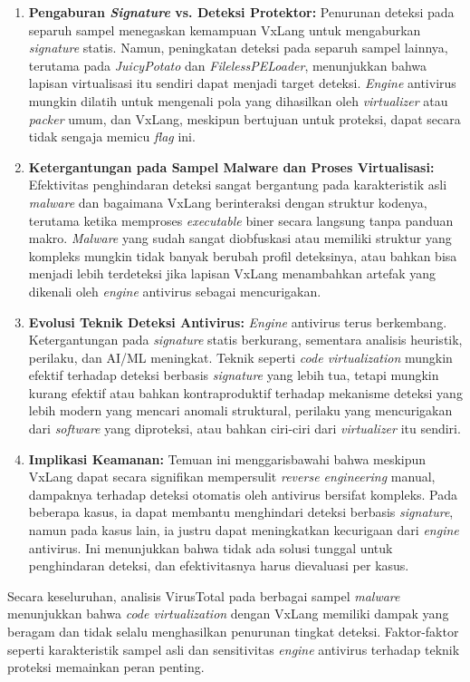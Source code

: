 \begin{enumerate}
    \item \textbf{Pengaburan \textit{Signature} vs. Deteksi Protektor:} Penurunan deteksi pada separuh sampel menegaskan kemampuan VxLang untuk mengaburkan \textit{signature} statis. Namun, peningkatan deteksi pada separuh sampel lainnya, terutama pada \textit{JuicyPotato} dan \textit{FilelessPELoader}, menunjukkan bahwa lapisan virtualisasi itu sendiri dapat menjadi target deteksi. \textit{Engine} antivirus mungkin dilatih untuk mengenali pola yang dihasilkan oleh \textit{virtualizer} atau \textit{packer} umum, dan VxLang, meskipun bertujuan untuk proteksi, dapat secara tidak sengaja memicu \textit{flag} ini.
    \item \textbf{Ketergantungan pada Sampel Malware dan Proses Virtualisasi:} Efektivitas penghindaran deteksi sangat bergantung pada karakteristik asli \textit{malware} dan bagaimana VxLang berinteraksi dengan struktur kodenya, terutama ketika memproses \textit{executable} biner secara langsung tanpa panduan makro. \textit{Malware} yang sudah sangat diobfuskasi atau memiliki struktur yang kompleks mungkin tidak banyak berubah profil deteksinya, atau bahkan bisa menjadi lebih terdeteksi jika lapisan VxLang menambahkan artefak yang dikenali oleh \textit{engine} antivirus sebagai mencurigakan.
    \item \textbf{Evolusi Teknik Deteksi Antivirus:} \textit{Engine} antivirus terus berkembang. Ketergantungan pada \textit{signature} statis berkurang, sementara analisis heuristik, perilaku, dan AI/ML meningkat. Teknik seperti \textit{code virtualization} mungkin efektif terhadap deteksi berbasis \textit{signature} yang lebih tua, tetapi mungkin kurang efektif atau bahkan kontraproduktif terhadap mekanisme deteksi yang lebih modern yang mencari anomali struktural, perilaku yang mencurigakan dari \textit{software} yang diproteksi, atau bahkan ciri-ciri dari \textit{virtualizer} itu sendiri.
    \item \textbf{Implikasi Keamanan:} Temuan ini menggarisbawahi bahwa meskipun VxLang dapat secara signifikan mempersulit \textit{reverse engineering} manual, dampaknya terhadap deteksi otomatis oleh antivirus bersifat kompleks. Pada beberapa kasus, ia dapat membantu menghindari deteksi berbasis \textit{signature}, namun pada kasus lain, ia justru dapat meningkatkan kecurigaan dari \textit{engine} antivirus. Ini menunjukkan bahwa tidak ada solusi tunggal untuk penghindaran deteksi, dan efektivitasnya harus dievaluasi per kasus.
\end{enumerate}
Secara keseluruhan, analisis VirusTotal pada berbagai sampel \textit{malware} menunjukkan bahwa \textit{code virtualization} dengan VxLang memiliki dampak yang beragam dan tidak selalu menghasilkan penurunan tingkat deteksi. Faktor-faktor seperti karakteristik sampel asli dan sensitivitas \textit{engine} antivirus terhadap teknik proteksi memainkan peran penting.
